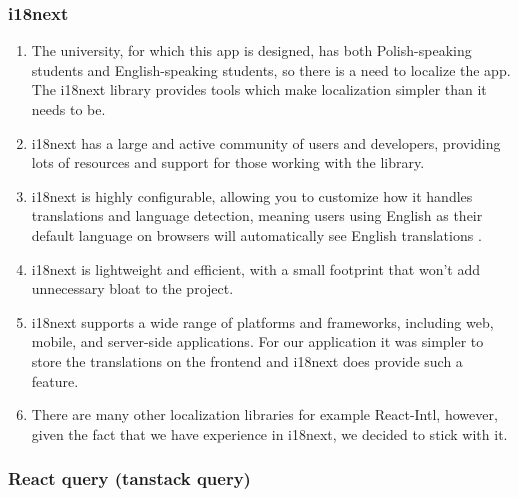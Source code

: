 \documentclass[singlespacing,12pt,parskip,headsepline,consistentlayout]{article}
\begin{document}
\subsubsection{i18next}
\begin{enumerate}
    \item The university, for which this app is designed, has both Polish-speaking students and English-speaking students, so there is a need to localize the app. The i18next library provides tools which make localization simpler than it needs to be.
    \item i18next has a large and active community of users and developers, providing lots of resources and support for those working with the library.
    \item i18next is highly configurable, allowing you to customize how it handles translations and language detection, meaning users using English as their default language on browsers will automatically see English translations \cite{i18nextDocs}.
    \item i18next is lightweight and efficient, with a small footprint that won't add unnecessary bloat to the project.
    \item i18next supports a wide range of platforms and frameworks, including web, mobile, and server-side applications. For our application it was simpler to store the translations on the frontend and i18next does provide such a feature.
    \item There are many other localization libraries for example React-Intl, however, given the fact that we have experience in i18next, we decided to stick with it.
\end{enumerate}

\subsubsection{React query (tanstack query)}
\end{document}
